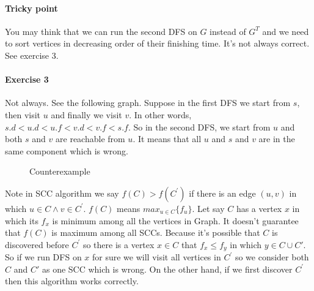 \documentclass{book}
\begin{document}
	\paragraph{Tricky point} You may think that we can run the second DFS on $G$ instead of $G^T$ and we need to sort vertices in decreasing order of their finishing time. It's not always correct. See exercise 3.
	
	\paragraph{Exercise 3}
	Not always. See the following graph. Suppose in the first DFS we start from $s$, then visit $u$ and finally we visit $v$. In other words, $s.d < u.d < u.f < v.d < v.f < s.f$. So in the second DFS, we start from $u$ and both $s$ and $v$ are reachable from $u$. It means that all $u$ and $s$ and $v$ are in the same component which is wrong.
	
	\begin{figure}[h!]
		\centering
		\caption{Counterexample}
					\end{figure}	
	
	\FloatBarrier
	
	Note in SCC algorithm we say $f(C) > f(C^\prime)$ if there is an edge $(u, v)$ in which $u \in C \land v \in C^\prime$. $f(C)$ means $max_{u \in C}{\{f_u\}}$. Let say $C$ has a vertex $x$ in which its $f_x$ is minimum among all the vertices in Graph. It doesn't guarantee that $f(C)$ is maximum among all SCCs. Because it's possible that $C$ is discovered before $C^\prime$ so there is a vertex $x \in C$ that $f_x \le f_y$ in which $y \in C \cup C\prime$. So if we run DFS on $x$ for sure we will visit all vertices in $C^\prime$ so we consider both $C$ and $C\prime$ as one SCC which is wrong. On the other hand, if we first discover $C^\prime$ then this algorithm works correctly.
	
\end{document}
